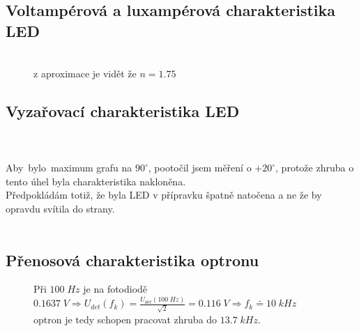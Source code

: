 \documentclass{article}
\begin{document}
\subsection{Voltampérová a luxampérová charakteristika LED}
\begin{figure}[H]
	\begin{minipage}[t]{0.35\textwidth}
        
    \end{minipage}
    \hfill
	\begin{minipage}[t]{0.63\textwidth}
        \pgfplotsset{width=105mm,compat=1.9}
        
        \\ \hspace*{5mm}
        z aproximace je vidět že \(n = 1.75\)
    \end{minipage}
\end{figure}
\newpage
\subsection{Vyzařovací charakteristika LED}
\pgfplotsset{width=160mm,compat=1.11}

\\ \\
Aby~bylo~maximum grafu na \(90^\circ\), pootočil jsem měření o \(+20^\circ\), protože zhruba o tento úhel byla charakteristika nakloněna. \\
Předpokládám totiž, že byla LED v přípravku špatně natočena a ne že by opravdu svítila do strany.
\\ \\


\subsection{Přenosová charakteristika optronu}
\begin{figure}[H]
	\begin{minipage}[t]{0.2\textwidth}
        
    \end{minipage}
    \hfill
	\begin{minipage}[t]{0.7\textwidth}
        \pgfplotsset{width=115mm,compat=1.9}
        \vspace{-78.5mm}
        
        Při \(100\;Hz\) je na fotodiodě \\
        \(0.1637\;V \Rightarrow U_{det}(f_k) = \frac{U_{det}(100\;Hz)}{\sqrt{2}}=0.116\;V \Rightarrow f_k \doteq 10\;kHz\)  \\
        optron je tedy schopen pracovat zhruba do \(13.7\;kHz\). 
    \end{minipage}
\end{figure}
\end{document}
